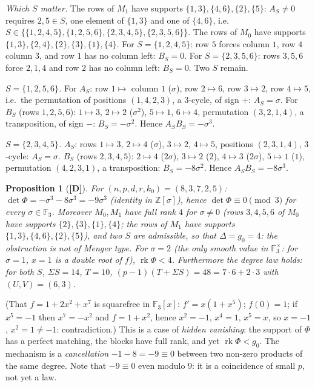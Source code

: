 \documentclass[11pt,a4paper]{article}
\newtheorem{proposition}[theorem]{Proposition}
\newcommand{\F}{\mathbb{F}}
\begin{document}
\emph{Which $S$ matter.} The rows of $M_1$ have supports
$\{1,3\},\{4,6\},\{2\},\{5\}$: $A_S\ne0$ requires $2,5\in S$, one element of
$\{1,3\}$ and one of $\{4,6\}$, i.e.\ $S\in\{\{1,2,4,5\},\{1,2,5,6\},\{2,3,4,5\},
\{2,3,5,6\}\}$. The rows of $M_0$ have supports
$\{1,3\},\{2,4\},\{2\},\{3\},\{1\},\{4\}$. For $S=\{1,2,4,5\}$: row $5$ forces
column $1$, row $4$ column $3$, and row $1$ has no column left: $B_S=0$. For
$S=\{2,3,5,6\}$: rows $3,5,6$ force $2,1,4$ and row $2$ has no column left:
$B_S=0$. Two $S$ remain.

\emph{$S=\{1,2,5,6\}$.} For $A_S$: row $1\mapsto$ column $1$ ($\sigma$), row
$2\mapsto6$, row $3\mapsto2$, row $4\mapsto5$, i.e.\ the permutation of positions
$(1,4,2,3)$, a $3$-cycle, of sign $+$: $A_S=\sigma$. For $B_S$ (rows
$1,2,5,6$): $1\mapsto3$, $2\mapsto2$ ($\sigma^2$), $5\mapsto1$, $6\mapsto4$,
permutation $(3,2,1,4)$, a transposition, of sign $-$: $B_S=-\sigma^2$. Hence
$A_SB_S=-\sigma^3$.

\emph{$S=\{2,3,4,5\}$.} $A_S$: rows $1\mapsto3$, $2\mapsto4$ ($\sigma$),
$3\mapsto2$, $4\mapsto5$, positions $(2,3,1,4)$, $3$-cycle: $A_S=\sigma$. $B_S$
(rows $2,3,4,5$): $2\mapsto4$ ($2\sigma$), $3\mapsto2$ ($2$), $4\mapsto3$
($2\sigma$), $5\mapsto1$ ($1$), permutation $(4,2,3,1)$, a transposition:
$B_S=-8\sigma^2$. Hence $A_SB_S=-8\sigma^3$.

\begin{proposition}[\textbf{[D]}]
\label{prop:exA}
For $(n,p,d,r,k_0)=(8,3,7,2,5)$: $\det\Phi=-\sigma^3-8\sigma^3=-9\sigma^3$
(identity in $\mathbb Z[\sigma]$), hence $\det\Phi\equiv0\pmod 3$ for every
$\sigma\in\F_3$. Moreover $M_0,M_1$ have full rank $4$ for $\sigma\neq0$ (rows
$3,4,5,6$ of $M_0$ have supports $\{2\},\{3\},\{1\},\{4\}$; the rows of $M_1$ have
supports $\{1,3\},\{4,6\},\{2\},\{5\}$), and two $S$ are admissible, so that
$\Delta=g_0=4$: the obstruction is not of Menger type. For $\sigma=2$ (the only
smooth value in $\F_3^\times$: for $\sigma=1$, $x=1$ is a double root of $f$),
$\operatorname{rk}\Phi<4$. Furthermore the degree law holds: for both $S$,
$\Sigma S=14$, $T=10$, $(p-1)(T+\Sigma S)=48=7\cdot6+2\cdot3$ with
$(U,V)=(6,3)$.
\end{proposition}

(That $f=1+2x^2+x^7$ is squarefree in $\F_3[x]$: $f'=x(1+x^5)$; $f(0)=1$; if
$x^5=-1$ then $x^7=-x^2$ and $f=1+x^2$, hence $x^2=-1$, $x^4=1$, $x^5=x$, so
$x=-1$, $x^2=1\ne-1$: contradiction.) This is a case of \emph{hidden vanishing}:
the support of $\Phi$ has a perfect matching, the blocks have full rank, and yet
$\operatorname{rk}\Phi<g_0$. The mechanism is a \emph{cancellation} $-1-8=-9\equiv0$
between two non-zero products of the same degree. Note that $-9\equiv0$ even
modulo $9$: it is a coincidence of small $p$, not yet a law.
\end{document}
